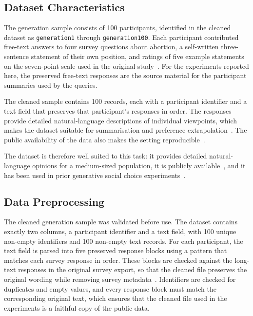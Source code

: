\documentclass[letterpaper,11pt]{article}
\theoremstyle{plain}
\theoremstyle{definition}
\begin{document}
\subsection{Dataset Characteristics}

The generation sample consists of 100 participants, identified in the cleaned dataset as \texttt{generation1} through \texttt{generation100}. Each participant contributed free-text answers to four survey questions about abortion, a self-written three-sentence statement of their own position, and ratings of five example statements on the seven-point scale used in the original study~\citep{fish2026gsc,gsc_survey_data}. For the experiments reported here, the preserved free-text responses are the source material for the participant summaries used by the queries.

The cleaned sample contains 100 records, each with a participant identifier and a text field that preserves that participant's responses in order. The responses provide detailed natural-language descriptions of individual viewpoints, which makes the dataset suitable for summarisation and preference extrapolation~\citep{fish2026gsc}. The public availability of the data also makes the setting reproducible~\citep{gsc_survey_data}.

The dataset is therefore well suited to this task: it provides detailed natural-language opinions for a medium-sized population, it is publicly available~\citep{gsc_survey_data}, and it has been used in prior generative social choice experiments~\citep{fish2026gsc,boehmer2025nextgen}.

\subsection{Data Preprocessing}

The cleaned generation sample was validated before use. The dataset contains exactly two columns, a participant identifier and a text field, with 100 unique non-empty identifiers and 100 non-empty text records. For each participant, the text field is parsed into five preserved response blocks using a pattern that matches each survey response in order. These blocks are checked against the long-text responses in the original survey export, so that the cleaned file preserves the original wording while removing survey metadata~\citep{fish2026gsc,gsc_survey_data}. Identifiers are checked for duplicates and empty values, and every response block must match the corresponding original text, which ensures that the cleaned file used in the experiments is a faithful copy of the public data.
\end{document}
